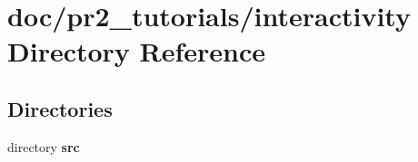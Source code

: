 \section{doc/pr2\-\_\-tutorials/interactivity Directory Reference}
\label{dir_f967f1fefec0ca40512eb336625ee0ae}
\subsection*{Directories}
\begin{DoxyCompactItemize}
\item 
directory {\bf src}
\end{DoxyCompactItemize}
